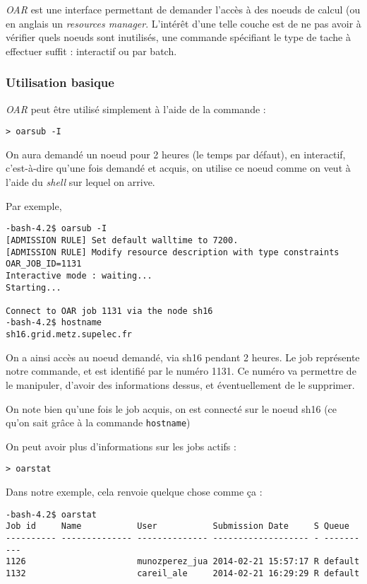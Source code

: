 \par \emph{OAR} est une interface permettant de demander l'accès à des noeuds de calcul (ou en anglais un \emph{resources manager}. L'intérêt d'une telle couche est de ne pas avoir à vérifier quels noeuds sont inutilisés, une commande spécifiant le type de tache à effectuer suffit : interactif ou par batch.


\subsubsection{Utilisation basique}
\label{subsec:utilisation-basique}

\par \emph{OAR} peut être utilisé simplement à l'aide de la commande :
\begin{verbatim}
> oarsub -I
\end{verbatim}

\par On aura demandé un noeud pour 2 heures (le temps par défaut), en interactif, c'est-à-dire qu'une fois demandé et acquis, on utilise ce noeud comme on veut à l'aide du \emph{shell} sur lequel on arrive.

\par Par exemple, 
\begin{verbatim}
-bash-4.2$ oarsub -I
[ADMISSION RULE] Set default walltime to 7200.
[ADMISSION RULE] Modify resource description with type constraints
OAR_JOB_ID=1131
Interactive mode : waiting...
Starting...

Connect to OAR job 1131 via the node sh16
-bash-4.2$ hostname
sh16.grid.metz.supelec.fr
\end{verbatim}
\par On a ainsi accès au noeud demandé, via sh16 pendant 2 heures. Le job représente notre commande, et est identifié par le numéro 1131. Ce numéro va permettre de le manipuler, d'avoir des informations dessus, et éventuellement de le supprimer.
\par On note bien qu'une fois le job acquis, on est connecté sur le noeud sh16 (ce qu'on sait grâce à la commande \texttt{hostname})

\par On peut avoir plus d'informations sur les jobs actifs :
\begin{verbatim}
> oarstat
\end{verbatim}

\par Dans notre exemple, cela renvoie quelque chose comme ça :
\begin{verbatim}
-bash-4.2$ oarstat
Job id     Name           User           Submission Date     S Queue
---------- -------------- -------------- ------------------- - ----------
1126                      munozperez_jua 2014-02-21 15:57:17 R default   
1132                      careil_ale     2014-02-21 16:29:29 R default   
\end{verbatim}

